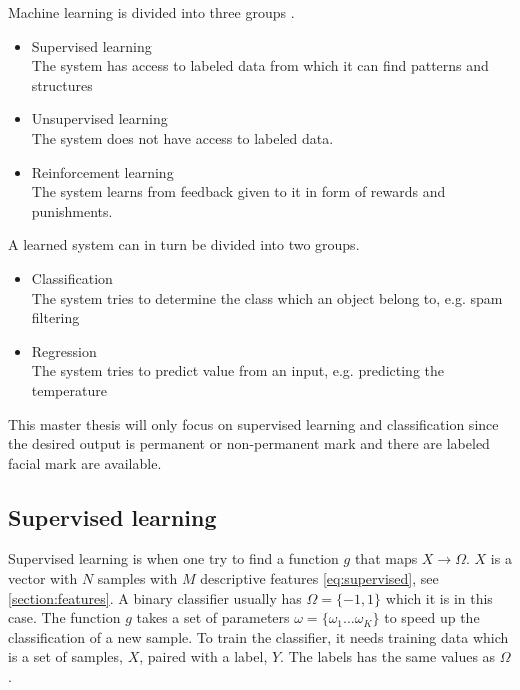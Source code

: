 Machine learning is divided into three groups \cite{bishop2006pattern}. 

\begin{itemize}
	\item Supervised learning \\
	The system has access to labeled data from which it can find patterns and structures
	  
	\item Unsupervised learning \\
	The system does not have access to labeled data.
	
	\item Reinforcement learning \\
	The system learns from feedback given to it in form of rewards and punishments. 
\end{itemize}

A learned system can in turn be divided into two groups. 

\begin{itemize}
		\item Classification \\
		The system tries to determine the class which an object belong to, e.g. spam filtering
		
		\item Regression \\
		The system tries to predict value from an input, e.g. predicting the temperature 
\end{itemize}

This master thesis will only focus on supervised learning and classification since the desired output is permanent or non-permanent mark and there are labeled facial mark are available.  

\subsection{Supervised learning}

Supervised learning is when one try to find a function $g$ that maps $X \to \Omega$. $X$ is a vector with $N$ samples with $M$ descriptive features \cref{eq:supervised}, see \cref{section:features}. A binary classifier usually has $\Omega = \{-1,1\}$ which it is in this case. The function $g$ takes a set of parameters $\omega = \{\omega_1 \dots \omega_K\} $ to speed up the classification of a new sample. To train the classifier, it needs training data which is a set of samples, $X$, paired with a label, $Y$. The labels has the same values as $\Omega$. 

